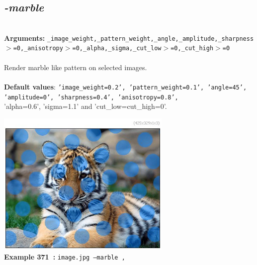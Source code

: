 \documentclass[a4paper,11pt,twoside]{book}
\begin{document}
\subsection{\emph{-marble} }\vspace*{-0.5em}
~\\\textbf{Arguments: } 
{\small \texttt{\_image\_weight,\_pattern\_weight,\_angle,\_amplitude,\_sharpness$>$=0,\_anisotropy$>$=0,\_alpha,\_sigma,\_cut\_low$>$=0,\_cut\_high$>$=0}}\\~\\
Render marble like pattern on selected images.
~\\~\\\textbf{Default values}: {\small \texttt{'image\_weight=0.2', 'pattern\_weight=0.1', 'angle=45', 'amplitude=0', 'sharpness=0.4', 'anisotropy=0.8',}}
~\\'alpha=0.6', 'sigma=1.1' and 'cut\_low=cut\_high=0'.
\begin{center}\includegraphics[keepaspectratio=true,height=7cm,width=\textwidth]{img/gmic_def371.jpg}\\
{\footnotesize \textbf{Example 371~:} \texttt{image.jpg --marble ,}}
\end{center}
\end{document}
